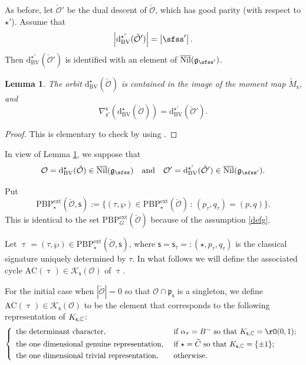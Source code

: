 \documentclass[11pt,a4paper]{amsart}
\def\abs#1{\left|{#1}\right|}
\newcommand{\CK}{{\mathcal {K}}}
\newcommand{\CO}{{\mathcal {O}}}
\newcommand{\g}{\mathfrak g}
\newcommand{\p}{\mathfrak p}
\numberwithin{equation}{section}
\newtheorem{lem}[thm]{Lemma}
\theoremstyle{remark}
\def\Nil{\overline{\mathrm{Nil}}}
\def\PBPe{\mathrm{PBP}^{\mathrm{ext}}}
\begin{document}
As before, let $\check \CO'$ be the dual descent of $\check \CO$, which has good parity (with respect to $\star'$). Assume that
\[
  \abs{\mathrm d_{\mathrm{BV}}^{\star'}(\check \CO')}=\abs{\sfss'}.
\]
Then  $\mathrm d_{\mathrm{BV}}^{\star'}(\check \CO')$ is identified with an element of $\Nil(\g_{\sfss'})$.

\begin{lem}\label{dualdesc}
The orbit $\mathrm d_{\mathrm{BV}}^{\star}(\check \CO)$ is contained in the image of the moment map $\tilde M_{\mathsf s}$, and
\[
  \nabla_{\mathsf s'}^{\mathsf s}(\mathrm d_{\mathrm{BV}}^{\star}(\check \CO))=\mathrm d_{\mathrm{BV}}^{\star'}(\check \CO').
\]
\end{lem}
\begin{proof}
This is elementary to check by using .
\end{proof}

In view of Lemma \ref{dualdesc}, we suppose that
\[
\CO=\mathrm d_{\mathrm{BV}}^\star(\check \CO)\in \Nil(\g_\sfss)\quad \textrm{and}\quad \CO'=\mathrm d_{\mathrm{BV}}^{\star'}(\check \CO')\in \Nil(\g_{\sfss'}).
\]

Put
\begin{equation}\label{def:PBPs}
  \PBPe_\star(\check \CO,\mathsf s):=\{(\tau, \wp)\in  \PBPe_\star(\check \CO)\,:\, (p_\tau,q_\tau)=(p,q)\}.
\end{equation}
This is identical to the set $ \PBPe_G(\check \CO)$ because of the assumption \eqref{defg}.

Let $\uptau=(\tau, \wp)\in \PBPe_\star(\check \CO,\mathsf s)$, where $\mathsf s=\mathsf s_{\tau}=:(\star, p_\tau, q_\tau)$ is the classical signature uniquely determined by $\tau$. In what follows we will define the associated cycle $\mathrm{AC}(\uptau)\in\CK_{\mathsf s}(\CO)$ of $\uptau$.

For the initial case when $|\check \CO|=0$
so that $\CO\cap \p_{\mathsf s}$ is a singleton, we define  $\mathrm{AC}(\uptau)\in\CK_{\mathsf s}(\CO)$ to be the element that corresponds to the following  representation of $K_{\mathsf s,\mathbb{C}}$:
 \[
\left\{
     \begin{array}{ll}
                    \textrm{the determinant character} , &\hbox{ if $\alpha_\tau=B^-$ so that $K_{\mathsf s,\C}=\rO(0,1)$;} \smallskip\\
                    \textrm{the one dimensional genuine representation} , &\hbox{ if $\star=\widetilde C$ so that $K_{\mathsf s,\C}=\{\pm 1\}$;} \smallskip\\
 \textrm{the one dimensional trivial representation} , &\hbox{ otherwise.}            \end{array}
   \right.
\]
\end{document}
